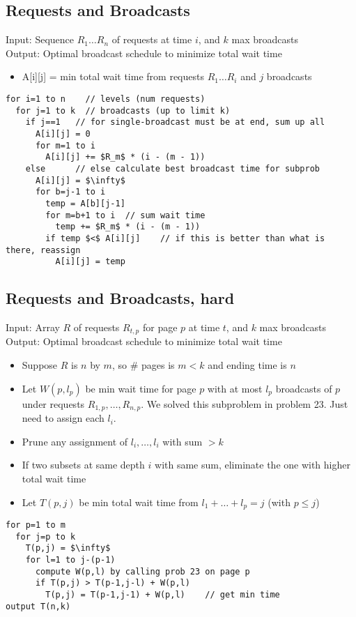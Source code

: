 \documentclass[12pt]{article}
\providecommand{\tightlist}{
    \setlength{\itemsep}{0pt}\setlength{\parskip}{0pt}
}
\begin{document}
\subsection{Requests and Broadcasts}
Input: Sequence $R_1 \dots R_n$ of requests at time $i$, and $k$ max broadcasts\\
Output: Optimal broadcast schedule to minimize total wait time
\begin{itemize}\tightlist
  \item A[i][j] = min total wait time from requests $R_1 \dots R_i$ and $j$ broadcasts
\end{itemize}
\begin{lstlisting}
for i=1 to n    // levels (num requests)
  for j=1 to k  // broadcasts (up to limit k)
    if j==1   // for single-broadcast must be at end, sum up all
      A[i][j] = 0
      for m=1 to i
        A[i][j] += $R_m$ * (i - (m - 1))
    else      // else calculate best broadcast time for subprob
      A[i][j] = $\infty$
      for b=j-1 to i
        temp = A[b][j-1]
        for m=b+1 to i  // sum wait time
          temp += $R_m$ * (i - (m - 1))
        if temp $<$ A[i][j]    // if this is better than what is there, reassign
          A[i][j] = temp
\end{lstlisting}



\subsection{Requests and Broadcasts, hard}
Input: Array $R$ of requests $R_{t,p}$ for page $p$ at time $t$, and $k$ max broadcasts\\
Output: Optimal broadcast schedule to minimize total wait time
\begin{itemize}
  \item Suppose $R$ is $n$ by $m$, so \# pages is $m < k$ and ending time is $n$
  \item Let $W(p,l_p)$ be min wait time for page $p$ with at most $l_p$ broadcasts of $p$ under requests $R_{1,p}, \dots, R_{n,p}$. We solved this subproblem in problem 23. Just need to assign each $l_i$.
  \item Prune any assignment of $l_i,\dots,l_i$ with sum $> k$
  \item If two subsets at same depth $i$ with same sum, eliminate the one with higher total wait time
  \item Let $T(p,j)$ be min total wait time from $l_1 + \dots + l_p = j$ (with $p \leq j$)
\end{itemize}
\begin{lstlisting}
for p=1 to m
  for j=p to k
    T(p,j) = $\infty$
    for l=1 to j-(p-1)
      compute W(p,l) by calling prob 23 on page p
      if T(p,j) > T(p-1,j-l) + W(p,l)
        T(p,j) = T(p-1,j-1) + W(p,l)    // get min time
output T(n,k)
\end{lstlisting}
\end{document}
